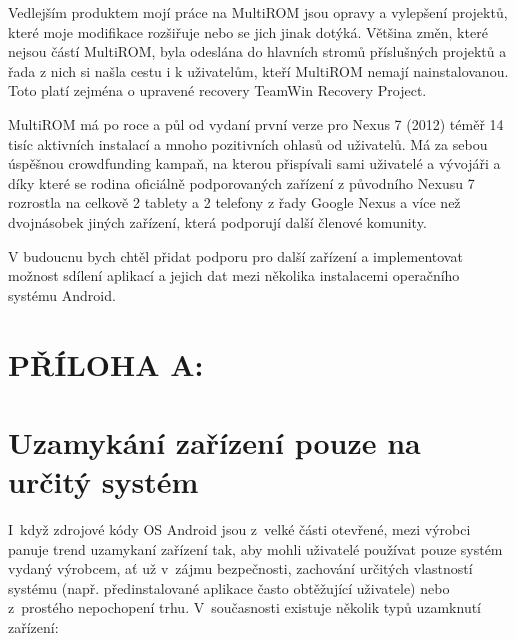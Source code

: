 \documentclass[12pt, a4paper, oneside]{article}
\begin{document}
Vedlejším produktem mojí práce na MultiROM jsou opravy a vylepšení projektů, které moje modifikace rozšiřuje nebo se jich jinak dotýká. Většina změn, které nejsou částí MultiROM, byla odeslána do hlavních stromů příslušných projektů a řada z nich si našla cestu i k uživatelům, kteří MultiROM nemají nainstalovanou. Toto platí zejména o upravené recovery TeamWin Recovery Project.

MultiROM má po roce a půl od vydaní první verze pro Nexus 7 (2012) téměř 14 tisíc aktivních instalací a mnoho pozitivních ohlasů od uživatelů. Má za sebou úspěšnou crowdfunding kampaň, na kterou přispívali sami uživatelé a vývojáři a díky které se rodina oficiálně podporovaných zařízení z původního Nexusu 7 rozrostla na celkově 2 tablety a 2 telefony z řady Google Nexus a více než dvojnásobek jiných zařízení, která podporují další členové komunity.

V budoucnu bych chtěl přidat podporu pro další zařízení a implementovat možnost sdílení aplikací a jejich dat mezi několika instalacemi operačního systému Android.

\newpage
\section*{PŘÍLOHA A:}
\section*{Uzamykání zařízení pouze na určitý systém}
\label{sec:locked}
I~když zdrojové kódy OS Android jsou z~velké části otevřené, mezi výrobci panuje trend uzamykaní zařízení tak, aby mohli uživatelé používat pouze systém vydaný výrobcem, ať už v~zájmu bezpečnosti, zachování určitých vlastností systému (např. předinstalované aplikace často obtěžující uživatele) nebo z~prostého nepochopení trhu. V~současnosti existuje několik typů uzamknutí zařízení:
\end{document}
